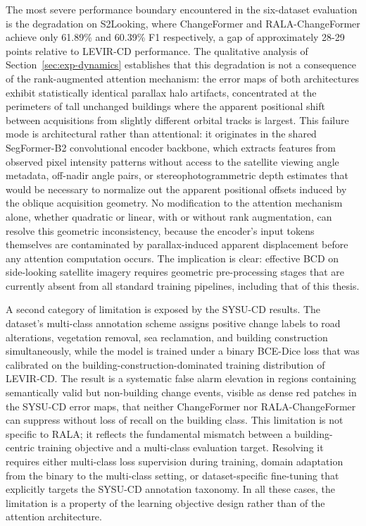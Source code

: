 The most severe performance boundary encountered in the six-dataset evaluation is the degradation on S2Looking, where ChangeFormer and RALA-ChangeFormer achieve only 61.89\% and 60.39\% F1 respectively, a gap of approximately 28-29 points relative to LEVIR-CD performance. The qualitative analysis of Section~\ref{sec:exp-dynamics} establishes that this degradation is not a consequence of the rank-augmented attention mechanism: the error maps of both architectures exhibit statistically identical parallax halo artifacts, concentrated at the perimeters of tall unchanged buildings where the apparent positional shift between acquisitions from slightly different orbital tracks is largest. This failure mode is architectural rather than attentional: it originates in the shared SegFormer-B2 convolutional encoder backbone, which extracts features from observed pixel intensity patterns without access to the satellite viewing angle metadata, off-nadir angle pairs, or stereophotogrammetric depth estimates that would be necessary to normalize out the apparent positional offsets induced by the oblique acquisition geometry. No modification to the attention mechanism alone, whether quadratic or linear, with or without rank augmentation, can resolve this geometric inconsistency, because the encoder's input tokens themselves are contaminated by parallax-induced apparent displacement before any attention computation occurs. The implication is clear: effective \ac{BCD} on side-looking satellite imagery requires geometric pre-processing stages that are currently absent from all standard training pipelines, including that of this thesis.

A second category of limitation is exposed by the SYSU-CD results. The dataset's multi-class annotation scheme assigns positive change labels to road alterations, vegetation removal, sea reclamation, and building construction simultaneously, while the model is trained under a binary BCE-Dice loss that was calibrated on the building-construction-dominated training distribution of LEVIR-CD. The result is a systematic false alarm elevation in regions containing semantically valid but non-building change events, visible as dense red patches in the SYSU-CD error maps, that neither ChangeFormer nor RALA-ChangeFormer can suppress without loss of recall on the building class. This limitation is not specific to \ac{RALA}; it reflects the fundamental mismatch between a building-centric training objective and a multi-class evaluation target. Resolving it requires either multi-class loss supervision during training, domain adaptation from the binary to the multi-class setting, or dataset-specific fine-tuning that explicitly targets the SYSU-CD annotation taxonomy. In all these cases, the limitation is a property of the learning objective design rather than of the attention architecture.


